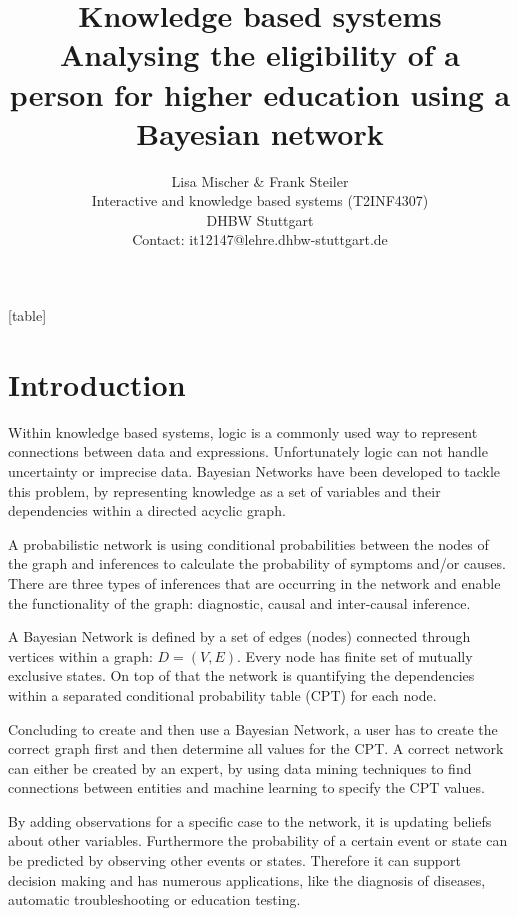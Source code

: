 \documentclass[%
	pdftex,
	oneside,        %
	11pt,           %
	parskip=half,   %
	headsepline,    %
	footsepline,    %
	abstracton,     %
	USenglish,      %
	a4paper,        %
]{report}
\title{Knowledge based systems\\ Analysing the eligibility of a person for higher education using a Bayesian network}
\author{Lisa Mischer \& Frank Steiler\\ Interactive and knowledge based systems (T2INF4307)\\ DHBW Stuttgart\\ Contact: it12147@lehre.dhbw-stuttgart.de}
\begin{document}

[table]

\maketitle

\newpage
\thispagestyle{empty}
\mbox{}
\setcounter{page}{0}

\tableofcontents

\chapter{Introduction}
Within knowledge based systems, logic is a commonly used way to represent connections between data and expressions. Unfortunately logic can not handle uncertainty or imprecise data. Bayesian Networks have been developed to tackle this problem, by representing knowledge as a set of variables and their dependencies within a directed acyclic graph. \cite{Reichardt:2014aa}

A probabilistic network is using conditional probabilities between the nodes of the graph and inferences to calculate the probability of symptoms and/or causes. There are three types of inferences that are occurring in the network and enable the functionality of the graph: diagnostic, causal and inter-causal inference.

A Bayesian Network is defined by a set of edges (nodes) connected through vertices within a graph: $D=(V,E)$. Every node has finite set of mutually exclusive states. On top of that the network is quantifying the dependencies within a separated conditional probability table (CPT) for each node. \cite{Vomlel:2005aa}

Concluding to create and then use a Bayesian Network, a user has to create the correct graph first and then determine all values for the CPT. A correct network can either be created by an expert, by using data mining techniques to find connections between entities and machine learning to specify the CPT values. 

By adding observations for a specific case to the network, it is updating beliefs about other variables. Furthermore the probability of a certain event or state can be predicted by observing other events or states. Therefore it can support decision making and has numerous applications, like the diagnosis of diseases, automatic troubleshooting or education testing. \cite{Vomlel:2005aa}
\end{document}

